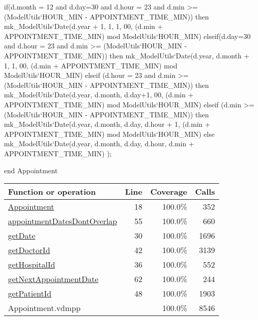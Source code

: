 \begin{vdmpp}[breaklines=true]
  if(d.month = 12 and d.day=30 and d.hour = 23 and d.min >= (ModelUtils`HOUR_MIN - APPOINTMENT_TIME_MIN)) then
   mk_ModelUtils`Date(d.year + 1, 1, 1, 00, (d.min + APPOINTMENT_TIME_MIN) mod ModelUtils`HOUR_MIN)
  elseif(d.day=30 and d.hour = 23 and d.min >= (ModelUtils`HOUR_MIN - APPOINTMENT_TIME_MIN)) then
   mk_ModelUtils`Date(d.year, d.month + 1, 1, 00, (d.min + APPOINTMENT_TIME_MIN) mod ModelUtils`HOUR_MIN)
  elseif (d.hour = 23 and d.min >= (ModelUtils`HOUR_MIN - APPOINTMENT_TIME_MIN)) then
   mk_ModelUtils`Date(d.year, d.month, d.day+1, 00, (d.min + APPOINTMENT_TIME_MIN) mod ModelUtils`HOUR_MIN)
  elseif (d.min >= (ModelUtils`HOUR_MIN - APPOINTMENT_TIME_MIN)) then
   mk_ModelUtils`Date(d.year, d.month, d.day, d.hour + 1, (d.min + APPOINTMENT_TIME_MIN) mod ModelUtils`HOUR_MIN)
  else
   mk_ModelUtils`Date(d.year, d.month, d.day, d.hour, d.min + APPOINTMENT_TIME_MIN)
 );
 
 
end Appointment
\end{vdmpp}
\bigskip
\begin{longtable}{|l|r|r|r|}
\hline
Function or operation & Line & Coverage & Calls \\
\hline
\hline
\hyperref[Appointment:18]{Appointment} & 18&100.0\% & 352 \\
\hline
\hyperref[appointmentDatesDontOverlap:55]{appointmentDatesDontOverlap} & 55&100.0\% & 660 \\
\hline
\hyperref[getDate:30]{getDate} & 30&100.0\% & 1696 \\
\hline
\hyperref[getDoctorId:42]{getDoctorId} & 42&100.0\% & 3139 \\
\hline
\hyperref[getHospitalId:36]{getHospitalId} & 36&100.0\% & 552 \\
\hline
\hyperref[getNextAppointmentDate:62]{getNextAppointmentDate} & 62&100.0\% & 244 \\
\hline
\hyperref[getPatientId:48]{getPatientId} & 48&100.0\% & 1903 \\
\hline
\hline
Appointment.vdmpp & & 100.0\% & 8546 \\
\hline
\end{longtable}

